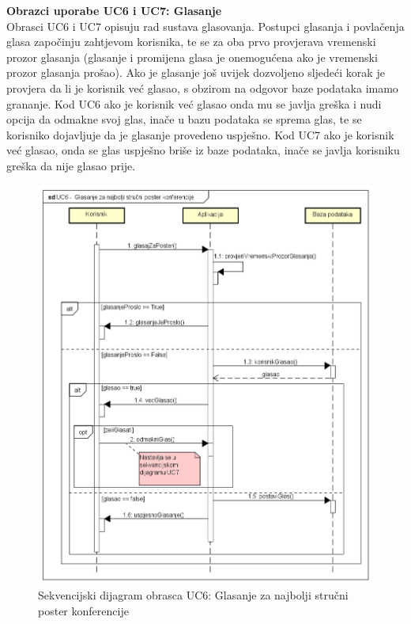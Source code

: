 				\textbf{Obrazci uporabe UC6 i UC7: Glasanje}\\
				Obrasci UC6 i UC7 opisuju rad sustava glasovanja. Postupci glasanja i povlačenja glasa započinju zahtjevom korisnika, te se za oba prvo provjerava vremenski prozor glasanja (glasanje i promijena glasa je onemogućena ako je vremenski prozor glasanja prošao). Ako je glasanje još uvijek dozvoljeno sljedeći korak je provjera da li je korisnik već glasao, s obzirom na odgovor baze podataka imamo grananje. Kod UC6 ako je korisnik već glasao onda mu se javlja greška i nudi opcija da odmakne svoj glas, inače u bazu podataka se sprema glas, te se korisniko dojavljuje da je glasanje provedeno uspješno. Kod UC7 ako je korisnik već glasao, onda se glas uspješno briše iz baze podataka, inače se javlja korisniku greška da nije glasao prije.
				\begin{figure}[H]
					\includegraphics[width=\textwidth]{slike/uc6Sekvencijski.PNG} %
					\caption{Sekvencijski dijagram obrasca UC6: Glasanje za najbolji stručni poster konferencije}
					\label{fig:uc6-sekvencijski} %
				\end{figure}
